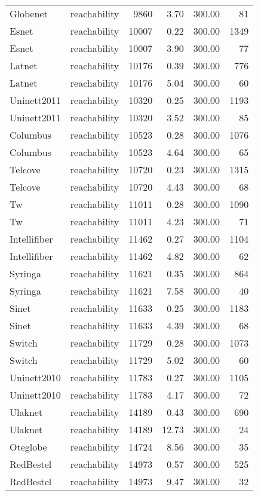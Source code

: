 \begin{tabular}{llrrrr}
Globenet & reachability & 9860 & 3.70 & 300.00 & 81 \\
Esnet & reachability & 10007 & 0.22 & 300.00 & 1349 \\
Esnet & reachability & 10007 & 3.90 & 300.00 & 77 \\
Latnet & reachability & 10176 & 0.39 & 300.00 & 776 \\
Latnet & reachability & 10176 & 5.04 & 300.00 & 60 \\
Uninett2011 & reachability & 10320 & 0.25 & 300.00 & 1193 \\
Uninett2011 & reachability & 10320 & 3.52 & 300.00 & 85 \\
Columbus & reachability & 10523 & 0.28 & 300.00 & 1076 \\
Columbus & reachability & 10523 & 4.64 & 300.00 & 65 \\
Telcove & reachability & 10720 & 0.23 & 300.00 & 1315 \\
Telcove & reachability & 10720 & 4.43 & 300.00 & 68 \\
Tw & reachability & 11011 & 0.28 & 300.00 & 1090 \\
Tw & reachability & 11011 & 4.23 & 300.00 & 71 \\
Intellifiber & reachability & 11462 & 0.27 & 300.00 & 1104 \\
Intellifiber & reachability & 11462 & 4.82 & 300.00 & 62 \\
Syringa & reachability & 11621 & 0.35 & 300.00 & 864 \\
Syringa & reachability & 11621 & 7.58 & 300.00 & 40 \\
Sinet & reachability & 11633 & 0.25 & 300.00 & 1183 \\
Sinet & reachability & 11633 & 4.39 & 300.00 & 68 \\
Switch & reachability & 11729 & 0.28 & 300.00 & 1073 \\
Switch & reachability & 11729 & 5.02 & 300.00 & 60 \\
Uninett2010 & reachability & 11783 & 0.27 & 300.00 & 1105 \\
Uninett2010 & reachability & 11783 & 4.17 & 300.00 & 72 \\
Ulaknet & reachability & 14189 & 0.43 & 300.00 & 690 \\
Ulaknet & reachability & 14189 & 12.73 & 300.00 & 24 \\
Oteglobe & reachability & 14724 & 8.56 & 300.00 & 35 \\
RedBestel & reachability & 14973 & 0.57 & 300.00 & 525 \\
RedBestel & reachability & 14973 & 9.47 & 300.00 & 32 \\

\end{tabular}
